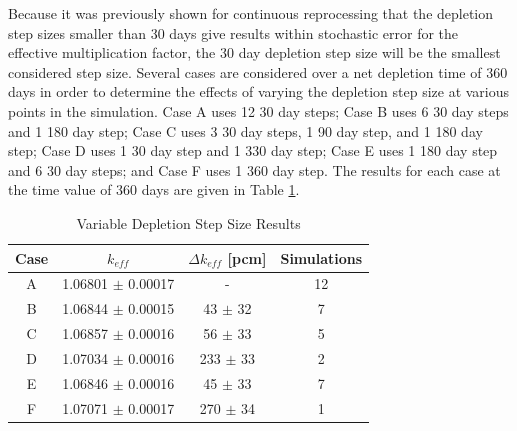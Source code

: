 Because it was previously shown for continuous reprocessing that the depletion step sizes smaller than 30 days give results within stochastic error for the effective multiplication factor, the 30 day depletion step size will be the smallest considered step size. Several cases are considered over a net depletion time of 360 days in order to determine the effects of varying the depletion step size at various points in the simulation. Case A uses 12 30 day steps; Case B uses 6 30 day steps and 1 180 day step; Case C uses 3 30 day steps, 1 90 day step, and 1 180 day step; Case D uses 1 30 day step and 1 330 day step; Case E uses 1 180 day step and 6 30 day steps; and Case F uses 1 360 day step. The results for each case at the time value of 360 days are given in Table \ref{tab:var-dep-step-size}.


\begin{table}[H]
\renewcommand{\arraystretch}{1.25}
\caption{Variable Depletion Step Size Results}
\label{tab:var-dep-step-size}
\begin{center}
\begin{tabular}{ | c | c | c | c | }
 \hline
 Case & $k_{eff}$ & $\Delta k_{eff}$ [pcm]  & Simulations\\
 \hline
 \hline
 A & 1.06801 $\pm$ 0.00017  & - & 12\\
 B & 1.06844 $\pm$ 0.00015 & 43 $\pm$ 32  & 7\\
 C & 1.06857 $\pm$ 0.00016  & 56 $\pm$ 33  & 5\\
 D & 1.07034 $\pm$ 0.00016 & 233 $\pm$ 33  & 2\\
 E & 1.06846 $\pm$ 0.00016 & 45 $\pm$ 33  & 7\\
 F & 1.07071 $\pm$ 0.00017 & 270 $\pm$ 34 & 1\\
 \hline
\end{tabular}
\end{center}
\end{table}


